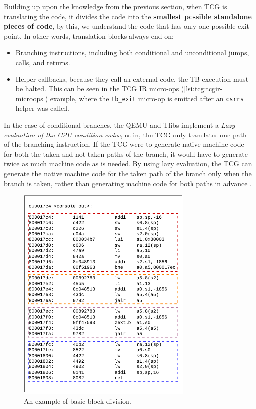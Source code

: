 Building up upon the knowledge from the previous section, when TCG is translating the code, it divides the
code into the \textbf{smallest possible standalone pieces of code}, by this, we understand the code that has only one
possible exit point. In other words, translation blocks always end on:
\begin{itemize}
    \item{Branching instructions, including both conditional and unconditional jumps, calls, and returns.}
    \item{Helper callbacks, because they call an external code, the TB execution must be halted. This can be seen
    in the TCG IR micro-ops (\ref{lst:tcg:tcgir-microops}) example, where the \texttt{tb\_exit} micro-op is emitted
    after an \texttt{csrrs} helper was called.}
\end{itemize}

In the case of conditional branches, the QEMU and Tlibs implement a \textit{Lazy evaluation of the CPU condition codes},
as in, the TCG only translates one path of the branching instruction. If the TCG were to generate native machine code
for both the taken and not-taken paths of the branch, it would have to generate twice as much machine code as is needed.
By using lazy evaluation, the TCG can generate the native machine code for the taken path of the branch only when the
branch is taken, rather than generating machine code for both paths in advance \cite{QemuInternalsTech}.

\pagebreak
\begin{figure}[h]
	\centering
	\includegraphics[height=400px]{figures/TranslactionBlocks.pdf}
	\caption{An example of basic block division.}
    \label{fig:block-division}
\end{figure}

